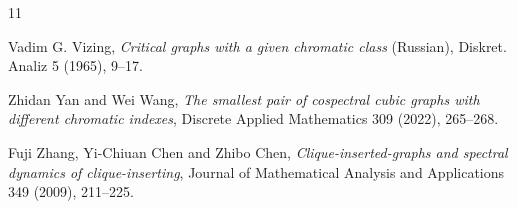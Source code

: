 \documentclass{article}
\begin{document}
\begin{thebibliography}{11}

 Vadim G. Vizing, {\em Critical graphs with a given chromatic class} (Russian), 
Diskret. Analiz 5 (1965), 9--17.

Zhidan Yan and Wei Wang,
{\em The smallest pair of cospectral cubic graphs with different chromatic indexes},
Discrete Applied Mathematics
309 (2022), 265--268.

Fuji Zhang, Yi-Chiuan Chen and Zhibo Chen,
{\em Clique-inserted-graphs and spectral dynamics of clique-inserting},
Journal of Mathematical Analysis and Applications 349 (2009), 211--225.

\end{thebibliography}
\end{document}
